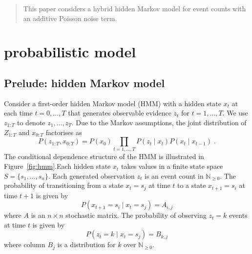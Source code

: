\documentclass[twoside, 11pt]{article}
\newcommand{\nonnegint}[0] {\mathbb{N}_{\geq 0}}
\begin{document}


\author{\name Reuben Fletcher-Costin}

\title{}

\maketitle

\begin{abstract}%
This paper considers a hybrid hidden Markov model for event counts with an additive Poisson noise term. 
\end{abstract}

\section{probabilistic model}
\subsection{Prelude: hidden Markov model}

Consider a first-order hidden Markov model (HMM) with a hidden state $x_t$ at each time $t=0,\ldots,T$ that generates observable evidence $z_t$ for $t=1,\ldots,T$. We use $z_{1:T}$ to denote $z_1, \ldots, z_T$. Due to the Markov assumptions, the joint distribution of $Z_{1:T}$ and $x_{0:T}$ factorises as
\begin{equation}
P(z_{1:T}, x_{0:T}) = P(x_0) \prod_{t=1, \ldots, T} P(z_t \mid x_t) P(x_t \mid x_{t-1} ) \; .
\end{equation}
The conditional dependence structure of the HMM is illustrated in Figure~\ref{fig:hmm}.Each hidden state $x_t$ takes values in a finite state space $S = \{ s_1, \ldots, s_n \}$. Each generated observation $z_t$ is an event count in $\nonnegint$. The probability of transitioning from a state $x_t=s_j$ at time $t$ to a state $x_{t+1}=s_i$ at time $t+1$ is given by
\begin{equation}
P(x_{t+1}=s_i \mid x_t=s_j) = A_{i,j}
\end{equation}
where $A$ is an $n \times n$ stochastic matrix. The probability of observing $z_t=k$ events at time $t$ is given by
\begin{equation}
P(z_t=k \mid x_t=s_j) = B_{k, j}
\end{equation}
where column $B_j$ is a distribution for $k$ over $\nonnegint$.

\end{document}
